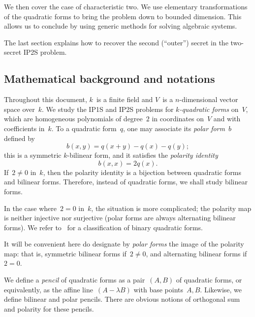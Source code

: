 \documentclass{lms}
\begin{document}
We then cover the case of characteristic two.
We use elementary transformations of the quadratic forms
to bring the problem down to bounded dimension.
This allows us to conclude by using generic methods
for solving algebraic systems.


The last section explains how to recover the second (``outer'') secret
in the two-secret IP2S problem.

\subsection*{Mathematical background and notations}
Throughout this document, $k$~is a finite field
and $V$~is a $n$-dimensional vector space over~$k$.
We study the IP1S and IP2S problems for \emph{$k$-quadratic forms} on~$V$,
which are homogeneous polynomials of degree~$2$ in coordinates on~$V$
and with coefficients in~$k$.
To a quadratic form~$q$,
one may associate its \emph{polar form}~$b$ defined by
\begin{equation*}\label{eq:polar}
b(x,y) = q(x+y) - q(x) - q(y);
\end{equation*}
this is a symmetric $k$-bilinear form,
and it satisfies the \emph{polarity identity}
\begin{equation*}\label{eq:polarity}
b(x,x) = 2q(x).
\end{equation*}
If~$2 ≠ 0$ in~$k$, then the polarity identity is a bijection between
quadratic forms and bilinear forms.
Therefore, instead of quadratic forms, we shall study bilinear forms.

In the case where~$2 = 0$ in~$k$, the situation is more complicated;
the polarity map is neither injective nor surjective
(polar forms are always alternating bilinear forms).
We refer to~\cite{milnorhusemoller} for a classification of
binary quadratic forms.

It will be convenient here do designate by \emph{polar forms}
the image of the polarity map: that is, symmetric bilinear forms if~$2 ≠ 0$,
and alternating bilinear forms if~$2 = 0$.

\medbreak
We define a \emph{pencil} of quadratic forms
as a pair~$(A, B)$ of quadratic forms,
or equivalently, as the affine line~$(A - λ B)$ with base points~$Α, B$.
Likewise, we define bilinear and polar pencils.
There are obvious notions of orthogonal sum and polarity for these pencils.
\end{document}
